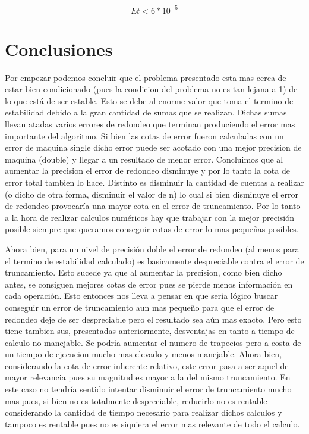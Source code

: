 \documentclass[11pt,a4paper]{article}
\begin{document}
\begin{equation}
    Et < 6*10^{-5}
\end{equation}

\section{Conclusiones}

Por empezar podemos concluir que el problema presentado esta mas cerca de estar bien condicionado (pues la condicion del problema no es tan lejana a 1) de lo que está de ser estable. Esto se debe al enorme valor que toma el termino de estabilidad debido a la gran cantidad de sumas que se realizan. Dichas sumas llevan atadas varios errores de redondeo que terminan produciendo el error mas importante del algoritmo. Si bien las cotas de error fueron calculadas con un error de maquina single dicho error puede ser acotado con una mejor precision de maquina (double) y llegar a un resultado de menor error. Concluimos que al aumentar la precision el error de redondeo disminuye y por lo tanto la cota de error total tambien lo hace. Distinto es disminuir la cantidad de cuentas a realizar (o dicho de otra forma, disminuir el valor de n) lo cual si bien disminuye el error de redondeo provocaría una mayor cota en el error de truncamiento. Por lo tanto a la hora de realizar calculos numéricos hay que trabajar con la mejor precisión posible siempre que queramos conseguir cotas de error lo mas pequeñas posibles.

Ahora bien, para un nivel de precisión doble el error de redondeo (al menos para el termino de estabilidad calculado) es basicamente despreciable contra el error de truncamiento. Esto sucede ya que al aumentar la precision, como bien dicho antes, se consiguen mejores cotas de error pues se pierde menos información en cada operación. Esto entonces nos lleva a pensar en que sería lógico buscar conseguir un error de truncamiento aun mas pequeño para que el error de redondeo deje de ser despreciable pero el resultado sea aún mas exacto. Pero esto tiene tambien sus, presentadas anteriormente, desventajas en tanto a tiempo de calculo no manejable. Se podría aumentar el numero de trapecios pero a costa de un tiempo de ejecucion mucho mas elevado y menos manejable. Ahora bien, considerando la cota de error inherente relativo, este error pasa a ser aquel de mayor relevancia pues su magnitud es mayor a la del mismo truncamiento. En este caso no tendría sentido intentar disminuir el error de truncamiento mucho mas pues, si bien no es totalmente despreciable, reducirlo no es rentable considerando la cantidad de tiempo necesario para realizar dichos calculos y tampoco es rentable pues no es siquiera el error mas relevante de todo el calculo.
\end{document}
